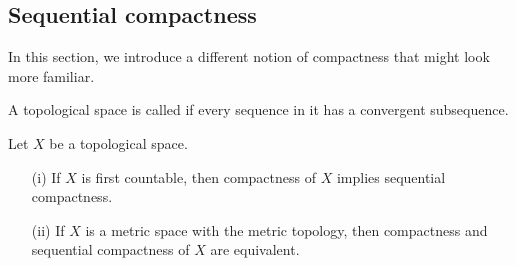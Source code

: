 \subsection{Sequential compactness}
In this section, we introduce a different notion of compactness that might look more familiar.

\begin{defn}
  A topological space is called  if every sequence in it has a convergent subsequence.
\end{defn}

\begin{thm}
  \label{seq-compact-vs-compact}
  Let $X$ be a topological space.
  \begin{enumerate}
    \item[(i)] If $X$ is first countable, then compactness of $X$ implies sequential compactness.
    \item[(ii)] If $X$ is a metric space with the metric topology, then compactness and sequential compactness of $X$ are equivalent.
  \end{enumerate}
\end{thm}
